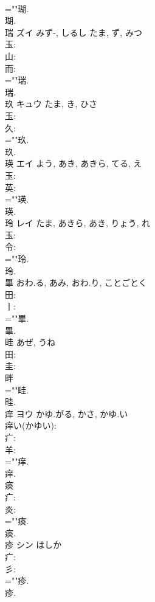 \documentclass[8pt]{extreport}
\begin{document}
\begin{CJK}{UTF8}{min}
\\	=""瑚.
\\	瑚.
\\	瑞	ズイ	みず-, しるし	たま, ず, みつ	
\\	玉: 
\\	山: 
\\	而: 
\\	=""瑞.
\\	瑞.
\\	玖	キュウ		たま, き, ひさ	
\\	玉: 
\\	久: 
\\	=""玖.
\\	玖.
\\	瑛	エイ		よう, あき, あきら, てる, え	
\\	玉: 
\\	英: 
\\	=""瑛.
\\	瑛.
\\	玲	レイ		たま, あきら, あき, りょう, れ	
\\	玉: 
\\	令: 
\\	=""玲.
\\	玲.
\\	畢		おわ.る, あみ, おわ.り, ことごとく				
\\	田: 
\\	丨: 
\\	=""畢.
\\	畢.
\\	畦		あぜ, うね				
\\	田: 
\\	圭: 
\\	畔 
\\	=""畦.
\\	畦.
\\	痒	ヨウ	かゆ.がる, かさ, かゆ.い		
\\	痒い(かゆい): 
\\	疒: 
\\	羊: 
\\	=""痒.
\\	痒.
\\	痰						
\\	疒: 
\\	炎: 
\\	=""痰.
\\	痰.
\\	疹	シン	はしか		
\\	疒: 
\\	彡: 
\\	=""疹.
\\	疹.

\end{CJK}
\end{document}
